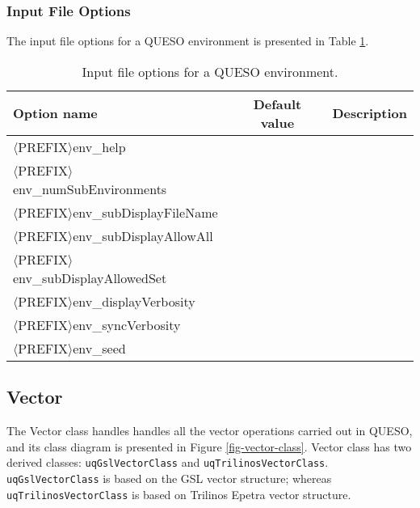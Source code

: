 \subsubsection{Input File Options}
The input file options for a QUESO environment is presented in Table \ref{tab-env-options}.
\begin{table}[htpb]
\begin{center}
\caption{Input file options for a QUESO environment.}\label{tab-env-options}
\ttfamily
\begin{tabular}{l|c|c}
\toprule
\rmfamily Option name                      & \rmfamily Default  value &\rmfamily Description \\
\midrule\midrule

$\langle$PREFIX$\rangle$env\_help                 &         &             \\

$\langle$PREFIX$\rangle$env\_numSubEnvironments   &         &             \\

$\langle$PREFIX$\rangle$env\_subDisplayFileName   &         &             \\

$\langle$PREFIX$\rangle$env\_subDisplayAllowAll   &         &             \\

$\langle$PREFIX$\rangle$env\_subDisplayAllowedSet &         &             \\

$\langle$PREFIX$\rangle$env\_displayVerbosity     &         &             \\

$\langle$PREFIX$\rangle$env\_syncVerbosity        &         &             \\

$\langle$PREFIX$\rangle$env\_seed                 &         &             \\
\bottomrule
\end{tabular}
\end{center}
\end{table}



\subsection{Vector}


The Vector class handles handles all the vector operations carried out in QUESO, and its class diagram is presented in Figure \ref{fig-vector-class}.
Vector class has two derived classes: \verb+uqGslVectorClass+ and \verb+uqTrilinosVectorClass+. \verb+uqGslVectorClass+ is based on the GSL vector structure; whereas \verb+uqTrilinosVectorClass+ is based on Trilinos Epetra vector structure.


